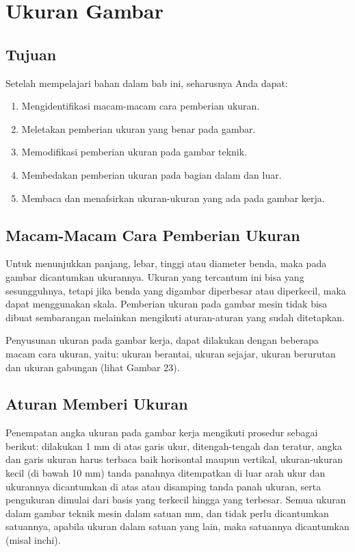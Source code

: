 \documentclass[11pt]{simart} %
\begin{document}
\section{Ukuran Gambar}

\subsection*{Tujuan}
Setelah mempelajari bahan dalam bab ini, seharusnya Anda dapat:
\begin{enumerate}
	\item Mengidentifikasi macam-macam cara pemberian ukuran.
	\item Meletakan pemberian ukuran yang benar pada gambar.
	\item Memodifikasi pemberian ukuran pada gambar teknik.
	\item Membedakan pemberian ukuran pada bagian dalam dan luar.
	\item Membaca dan menafsirkan ukuran-ukuran yang ada pada gambar kerja.
\end{enumerate}

\subsection{Macam-Macam Cara Pemberian Ukuran}
Untuk menunjukkan panjang, lebar, tinggi atau diameter benda, maka pada gambar dicantumkan ukurannya. Ukuran yang tercantum ini bisa yang sesungguhnya, tetapi jika benda yang digambar diperbesar atau diperkecil, maka dapat menggunakan skala. Pemberian ukuran pada gambar mesin tidak bisa dibuat sembarangan melainkan mengikuti aturan-aturan yang sudah ditetapkan.

Penyusunan ukuran pada gambar kerja, dapat dilakukan dengan beberapa macam cara ukuran, yaitu: ukuran berantai, ukuran sejajar, ukuran berurutan dan ukuran gabungan (lihat Gambar 23).

\subsection{Aturan Memberi Ukuran}
Penempatan angka ukuran pada gambar kerja mengikuti prosedur sebagai berikut: dilakukan 1 mm di atas garis ukur, ditengah-tengah dan teratur, angka dan garis ukuran harus terbaca baik horisontal maupun vertikal, ukuran-ukuran kecil (di bawah 10 mm) tanda panahnya ditempatkan di luar arah ukur dan ukurannya dicantumkan di atas atau disamping tanda panah ukuran, serta pengukuran dimulai dari basis yang terkecil hingga yang terbesar. Semua ukuran dalam gambar teknik mesin dalam satuan mm, dan tidak perlu dicantumkan satuannya, apabila ukuran dalam satuan yang lain, maka satuannya dicantumkan (misal inchi).
\end{document}
